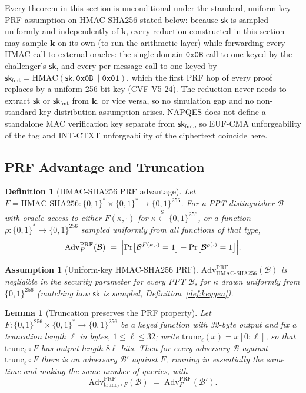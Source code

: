 \documentclass[11pt,a4paper]{article}
\newtheorem{lemma}[theorem]{Lemma}
\newtheorem{definition}[theorem]{Definition}
\newtheorem{assumption}[theorem]{Assumption}
\begin{document}
Every theorem in this section is unconditional under the standard,
uniform-key PRF assumption on HMAC-SHA256 stated below: because
$\mathsf{sk}$ is sampled uniformly and independently of $\mathbf{k}$, every
reduction constructed in this section may sample $\mathbf{k}$ on its own
(to run the arithmetic layer) while forwarding every HMAC call to
external oracles: the single domain-$\texttt{0x0B}$ call to one keyed by
the challenger's $\mathsf{sk}$, and every per-message call to one keyed by
$\mathsf{sk}_{\mathrm{fmt}}=\mathrm{HMAC}(\mathsf{sk},\texttt{0x0B}\|\texttt{0x01})$,
which the first PRF hop of every proof replaces by a uniform 256-bit key
(CVF-V5-24). The reduction never needs to extract $\mathsf{sk}$ or
$\mathsf{sk}_{\mathrm{fmt}}$ from $\mathbf{k}$, or vice versa, so no
simulation gap and no non-standard key-distribution assumption arises.
NAPQES does not define a standalone MAC verification key separate from
$\mathsf{sk}_{\mathrm{fmt}}$, so EUF-CMA unforgeability of the tag and
INT-CTXT unforgeability of the ciphertext coincide here.

\subsection{PRF Advantage and Truncation}

\begin{definition}[HMAC-SHA256 PRF advantage]\label{def:prf-adv}
Let $F=\mathrm{HMAC\text{-}SHA256}:\{0,1\}^{*}\times\{0,1\}^{*}\to\{0,1\}^{256}$.
For a PPT distinguisher $\mathcal{B}$ with oracle access to either
$F(\kappa,\cdot)$ for $\kappa\xleftarrow{\$}\{0,1\}^{256}$, or a function
$\rho:\{0,1\}^{*}\to\{0,1\}^{256}$ sampled uniformly from all functions of
that type,
\[
  \mathrm{Adv}^{\mathrm{PRF}}_{F}(\mathcal{B})
  \;=\;
  \Bigl|\Pr\bigl[\mathcal{B}^{F(\kappa,\cdot)}=1\bigr]-\Pr\bigl[\mathcal{B}^{\rho(\cdot)}=1\bigr]\Bigr|.
\]
\end{definition}

\begin{assumption}[Uniform-key HMAC-SHA256 PRF]\label{assum:hmac-prf}
$\mathrm{Adv}^{\mathrm{PRF}}_{\mathrm{HMAC\text{-}SHA256}}(\mathcal{B})$
is negligible in the security parameter for every PPT $\mathcal{B}$,
for $\kappa$ drawn uniformly from $\{0,1\}^{256}$ (matching how
$\mathsf{sk}$ is sampled, Definition~\ref{def:keygen}).
\end{assumption}

\begin{lemma}[Truncation preserves the PRF property]\label{lem:trunc-prf}
Let $F:\{0,1\}^{256}\times\{0,1\}^*\to\{0,1\}^{256}$ be a keyed function
with 32-byte output and fix a truncation length $\ell$ in \emph{bytes},
$1\le\ell\le32$; write $\mathrm{trunc}_\ell(x)=x[0{:}\ell]$, so that
$\mathrm{trunc}_\ell\circ F$ has output length $8\ell$ bits. Then for every
adversary $\mathcal{B}$ against $\mathrm{trunc}_\ell\circ F$ there is an
adversary $\mathcal{B}'$ against $F$, running in essentially the same time
and making the same number of queries, with
\[
  \mathrm{Adv}^{\mathrm{PRF}}_{\mathrm{trunc}_\ell\circ F}(\mathcal{B})
  \;=\;
  \mathrm{Adv}^{\mathrm{PRF}}_{F}(\mathcal{B}').
\]
\end{lemma}
\end{document}
